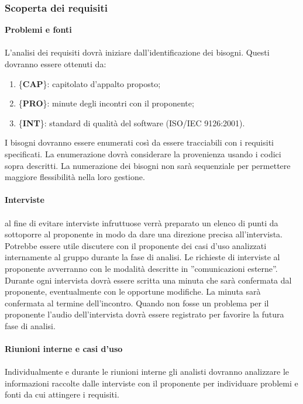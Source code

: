 {{		\subsubsection{Scoperta dei requisiti}{
			\textbf{Problemi e fonti}\\\\
			L’analisi dei requisiti dovr\`{a} iniziare dall’identificazione dei bisogni. Questi dovranno essere ottenuti da:
			\begin{enumerate}
				\item \{\textbf{CAP}\}: capitolato d'appalto proposto;
				\item \{\textbf{PRO}\}: minute degli incontri con il proponente;
				\item \{\textbf{INT}\}: standard di qualit\`{a} del software (ISO/IEC 9126:2001).
			\end{enumerate}
			I bisogni dovranno essere enumerati così da essere tracciabili con i requisiti specificati.
			La enumerazione dovr\`{a} considerare la provenienza usando i codici sopra descritti. La numerazione dei bisogni non sar\`{a} sequenziale per permettere maggiore flessibilit\`{a} nella loro gestione.\\\\
			\textbf{Interviste}\\\\
			al fine di evitare interviste infruttuose verr\`{a} preparato un elenco di punti da sottoporre al proponente in modo da dare una direzione precisa all’intervista. Potrebbe essere utile discutere con il proponente dei casi d'uso analizzati internamente al gruppo durante la fase di analisi.
			Le richieste di interviste al proponente avverranno con le modalit\`{a} descritte in ”comunicazioni esterne”. Durante ogni intervista dovr\`{a} essere scritta una minuta che sar\`{a} confermata dal proponente, eventualmente con le opportune modifiche. La minuta sar\`{a} confermata al termine dell’incontro. Quando non fosse un problema per il proponente l’audio dell’intervista dovr\`{a} essere registrato per favorire la futura fase di analisi.\\\\
			\textbf{Riunioni interne e casi d'uso}\\\\
			Individualmente e durante le riunioni interne gli analisti dovranno analizzare le informazioni raccolte dalle interviste con il proponente per individuare problemi e fonti da cui attingere i requisiti.\\
}}}
